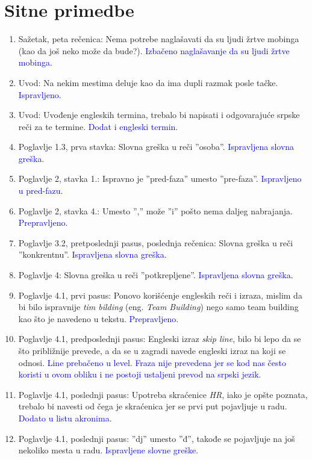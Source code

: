 \documentclass[a4paper]{report}
\newcommand{\odgovor}[1]{\textcolor{blue}{#1}}
\begin{document}
\section{Sitne primedbe}
\begin{enumerate}
\item Sažetak, peta rečenica: Nema potrebe naglašavati da su ljudi žrtve mobinga (kao da još neko može da bude?). \odgovor{Izbačeno naglašavanje da su ljudi žrtve mobinga.}
\item Uvod: Na nekim mestima deluje kao da ima dupli razmak posle tačke. \odgovor{Ispravljeno.}
\item Uvod: Uvođenje engleskih termina, trebalo bi napisati i odgovarajuće srpske reči za te termine. \odgovor{Dodat i engleski termin.}
\item Poglavlje 1.3, prva stavka: Slovna greška u reči ''osoba''. \odgovor{Ispravljena slovna greška.}
\item Poglavlje 2, stavka 1.: Ispravno je ''pred-faza'' umesto ''pre-faza''. \odgovor{Ispravljeno u pred-fazu.}
\item Poglavlje 2, stavka 4.: Umesto '','' može ''i'' pošto nema daljeg nabrajanja. \odgovor{Prepravljeno.}
\item Poglavlje 3.2, pretposlednji pasus, poslednja rečenica: Slovna greška u reči ''konkrentnu''. \odgovor{Ispravljena slovna greška.}
\item Poglavlje 4: Slovna greška u reči ''potkrepljene''. \odgovor{Ispravljena slovna greška.}
\item Poglavlje 4.1, prvi pasus: Ponovo korišćenje engleskih reči i izraza, mislim da bi bilo ispravnije \textit{tim bilding} (eng. \textit{Team Building}) nego samo team building kao što je navedeno u tekstu. \odgovor{Prepravljeno.}
\item Poglavlje 4.1, predposlednji pasus: Engleski izraz \textit{skip line}, bilo bi lepo da se što približnije prevede, a da se u zagradi navede engleski izraz na koji se odnosi. \odgovor{Line prebačeno u level. Fraza nije prevedena jer se kod nas često koristi u ovom obliku i ne postoji ustaljeni prevod na srpski jezik.}
\item Poglavlje 4.1, poslednji pasus: Upotreba skraćenice \textit{HR}, iako je opšte poznata, trebalo bi navesti od čega je skraćenica jer se prvi put pojavljuje u radu. \odgovor{Dodato u listu akronima.}
\item Poglavlje 4.1, poslednji pasus: ''dj'' umesto ''đ'', takođe se pojavljuje na još nekoliko mesta u radu. \odgovor{Ispravljene slovne greške.}

\end{enumerate}
\end{document}
